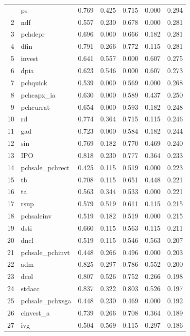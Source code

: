 \begin{footnotesize}
\begin{longtable}{rl|c|c|c|c|c}
		\hline\hline
		\endfoot
		1 & ps & 0.769 & 0.425 & 0.715 & 0.000 & 0.294 \\ 
		2 & ndf & 0.557 & 0.230 & 0.678 & 0.000 & 0.281 \\ 
		3 & pchdepr & 0.696 & 0.000 & 0.666 & 0.182 & 0.281 \\ 
		4 & dfin & 0.791 & 0.266 & 0.772 & 0.115 & 0.281 \\ 
		5 & invest & 0.641 & 0.557 & 0.000 & 0.607 & 0.275 \\ 
		6 & dpia & 0.623 & 0.546 & 0.000 & 0.607 & 0.273 \\ 
		7 & pchquick & 0.539 & 0.000 & 0.569 & 0.000 & 0.268 \\ 
		8 & pchcapx\_ia & 0.630 & 0.000 & 0.589 & 0.437 & 0.250 \\ 
		9 & pchcurrat & 0.654 & 0.000 & 0.593 & 0.182 & 0.248 \\ 
		10 & rd & 0.774 & 0.364 & 0.715 & 0.115 & 0.246 \\ 
		11 & gad & 0.723 & 0.000 & 0.584 & 0.182 & 0.244 \\ 
		12 & sin & 0.769 & 0.182 & 0.770 & 0.469 & 0.240 \\ 
		13 & IPO & 0.818 & 0.230 & 0.777 & 0.364 & 0.233 \\ 
		14 & pchsale\_pchrect & 0.425 & 0.115 & 0.519 & 0.000 & 0.223 \\ 
		15 & tb & 0.708 & 0.115 & 0.651 & 0.448 & 0.221 \\ 
		16 & ta & 0.563 & 0.344 & 0.533 & 0.000 & 0.221 \\ 
		17 & rsup & 0.579 & 0.519 & 0.611 & 0.115 & 0.215 \\ 
		18 & pchsaleinv & 0.519 & 0.182 & 0.519 & 0.000 & 0.215 \\ 
		19 & dsti & 0.660 & 0.115 & 0.563 & 0.115 & 0.211 \\ 
		20 & dncl & 0.519 & 0.115 & 0.546 & 0.563 & 0.207 \\ 
		21 & pchsale\_pchinvt & 0.448 & 0.266 & 0.496 & 0.000 & 0.203 \\ 
		22 & adm & 0.825 & 0.297 & 0.786 & 0.552 & 0.200 \\ 
		23 & dcol & 0.807 & 0.526 & 0.752 & 0.266 & 0.198 \\ 
		24 & stdacc & 0.837 & 0.322 & 0.803 & 0.526 & 0.197 \\ 
		25 & pchsale\_pchxsga & 0.448 & 0.230 & 0.469 & 0.000 & 0.192 \\ 
		26 & cinvest\_a & 0.739 & 0.266 & 0.708 & 0.364 & 0.189 \\ 
		27 & ivg & 0.504 & 0.569 & 0.115 & 0.297 & 0.186 \\ 

\end{longtable}
\end{footnotesize}
